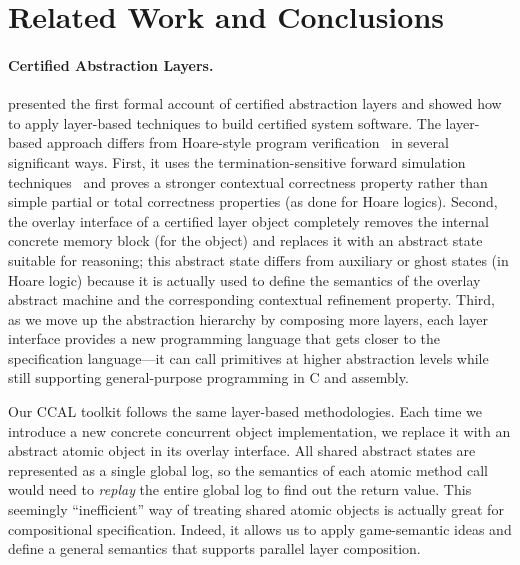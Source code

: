 \section{Related Work and Conclusions}
\label{sec:related}

\paragraph{Certified Abstraction Layers.} \cite{dscal15}
presented the first formal account of certified abstraction layers and
showed how to apply layer-based techniques to build certified system
software. The layer-based approach differs from Hoare-style program
verification~\cite{hoare69,reynolds02,boogie05,nanevski06} in several
significant ways. First, it uses the termination-sensitive forward
simulation techniques~\cite{Lynch95,compcert} and proves a stronger
contextual correctness property rather than simple partial or total
correctness properties (as done for Hoare logics).
Second, the overlay interface of a certified layer object completely
removes the internal concrete memory block (for the object) and
replaces it with an abstract state suitable for reasoning; this
abstract state differs from auxiliary or ghost states (in Hoare
logic) because it is actually used to define the semantics of the
overlay abstract machine and the corresponding contextual refinement
property.
Third, as we move up the abstraction hierarchy by composing more
layers, each layer interface provides a new programming language that gets
closer to the specification language---it can call primitives at
higher abstraction levels while still supporting general-purpose
programming in C and assembly.

Our CCAL toolkit follows the same layer-based methodologies. Each time
we introduce a new concrete concurrent object implementation, we
replace it with an abstract atomic object in its overlay
interface. All shared abstract states are represented as a single
global log, so the semantics of each atomic method call would need to
{\em replay} the entire global log to find out the return value.  This
seemingly ``inefficient'' way of treating shared atomic objects is
actually great for compositional specification. Indeed, it allows us
to apply game-semantic ideas and define a general semantics that
supports parallel layer composition.

